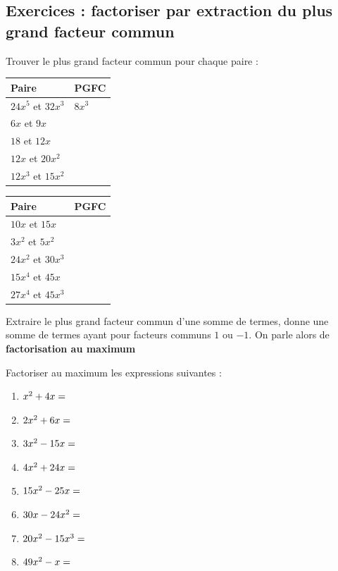 \documentclass[main.tex]{subfiles}
\begin{document}
\subsection{Exercices : factoriser par extraction du plus grand facteur commun} 
\begin{exercise} Trouver le plus grand facteur commun pour chaque paire :
	
	\renewcommand{\arraystretch}{1.6}
	\noindent
	\begin{tabularx}{0.48\linewidth}{|Y|Y|}\hline
		\textbf{Paire} & \textbf{PGFC}   \\ \hline  
		$24x^5$	et $32x^3$ & $8x^3$\\ \hline 
		$6x$	et  $9x$ &\\ \hline  
		$18$	et $12x$ &\\ \hline   
		$12x$	et $20x^2$ &\\ \hline 
		$12x^3$	et $15x^2$ &\\ \hline 
	\end{tabularx}  
	\begin{tabularx}{0.48\linewidth}{|Y|Y|}\hline
		\textbf{Paire} & \textbf{PGFC}   \\ \hline 
		$10x$	et $15x$ &\\ \hline 
		$3x^2$	et $5x^2$ &\\ \hline  
		$24x^2$ et $30x^3$ &\\ \hline 
		$15x^4$	et $45x$ &\\ \hline 
		$27x^4$	et $45x^3$ &\\ \hline  
	\end{tabularx}	
\end{exercise} 
\begin{eBox} 
	Extraire le plus grand facteur commun d'une somme de termes, donne une somme de termes ayant pour facteurs communs  $1$ ou $-1$. 
	On parle alors de \textbf{factorisation au maximum}
\end{eBox} 
\begin{exercise} Factoriser au maximum les expressions suivantes : \vspace{-1.5em}
	\begin{spacing}{1.8}
		\begin{multicols}{2}
			\begin{enumerate}[label={},leftmargin=*]%
				\item $x^2+4x=\dotfill $
				\item $2x^2+6x=\dotfill$
				\item $3x^2-15x=\dotfill$
				\item $4x^2+24x=\dotfill $
				\item $15x^2-25x=\dotfill $
				\item $30x-24x^2=\dotfill $ 
				\item $20x^2-15x^3=\dotfill $ 
				\item $49x^2-x=\dotfill$  
			\end{enumerate} 
		\end{multicols}
	\end{spacing}\vspace{-1.5em} 
\end{exercise}  
\end{document}
